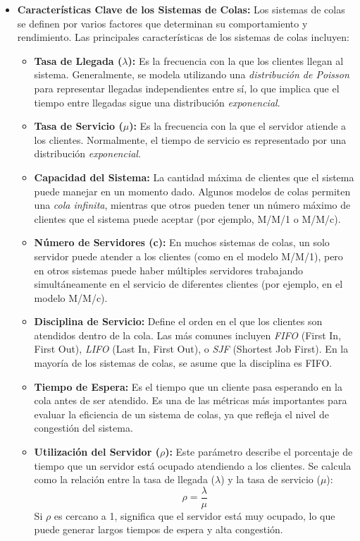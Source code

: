 \documentclass{article}
\begin{document}
\begin{itemize}
    \item \textbf{Características Clave de los Sistemas de Colas:} Los sistemas de colas se definen por varios factores que determinan su comportamiento y rendimiento. Las principales características de los sistemas de colas incluyen:
    \begin{itemize}
        \item \textbf{Tasa de Llegada (\(\lambda\)):} Es la frecuencia con la que los clientes llegan al sistema. Generalmente, se modela utilizando una \textit{distribución de Poisson} para representar llegadas independientes entre sí, lo que implica que el tiempo entre llegadas sigue una distribución \textit{exponencial}.
        \item \textbf{Tasa de Servicio (\(\mu\)):} Es la frecuencia con la que el servidor atiende a los clientes. Normalmente, el tiempo de servicio es representado por una distribución \textit{exponencial}.
        \item \textbf{Capacidad del Sistema:} La cantidad máxima de clientes que el sistema puede manejar en un momento dado. Algunos modelos de colas permiten una \textit{cola infinita}, mientras que otros pueden tener un número máximo de clientes que el sistema puede aceptar (por ejemplo, M/M/1 o M/M/c).
        \item \textbf{Número de Servidores (c):} En muchos sistemas de colas, un solo servidor puede atender a los clientes (como en el modelo M/M/1), pero en otros sistemas puede haber múltiples servidores trabajando simultáneamente en el servicio de diferentes clientes (por ejemplo, en el modelo M/M/c).
        \item \textbf{Disciplina de Servicio:} Define el orden en el que los clientes son atendidos dentro de la cola. Las más comunes incluyen \textit{FIFO} (First In, First Out), \textit{LIFO} (Last In, First Out), o \textit{SJF} (Shortest Job First). En la mayoría de los sistemas de colas, se asume que la disciplina es FIFO.
        \item \textbf{Tiempo de Espera:} Es el tiempo que un cliente pasa esperando en la cola antes de ser atendido. Es una de las métricas más importantes para evaluar la eficiencia de un sistema de colas, ya que refleja el nivel de congestión del sistema.
        \item \textbf{Utilización del Servidor (\(\rho\)):} Este parámetro describe el porcentaje de tiempo que un servidor está ocupado atendiendo a los clientes. Se calcula como la relación entre la tasa de llegada (\(\lambda\)) y la tasa de servicio (\(\mu\)):  
        \[
        \rho = \frac{\lambda}{\mu}
        \]
        Si \(\rho\) es cercano a 1, significa que el servidor está muy ocupado, lo que puede generar largos tiempos de espera y alta congestión.
    \end{itemize}


\end{itemize}
\end{document}
